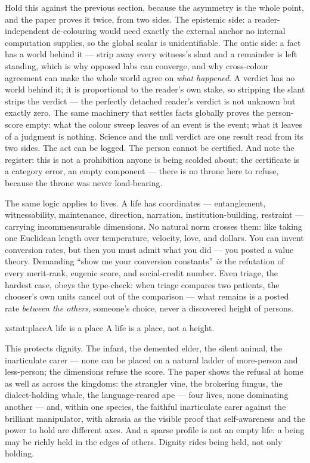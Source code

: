 \documentclass[../main_explainer]{subfiles}
\begin{document}
Hold this against the previous section, because the asymmetry is the whole point, and
the paper proves it twice, from two sides. The epistemic side: a reader-independent
de-colouring would need exactly the external anchor no internal computation supplies, so
the global scalar is unidentifiable. The ontic side: a fact has a world behind it ---
strip away every witness's slant and a remainder is left standing, which is why opposed
labs can converge, and why cross-colour agreement can make the whole world agree on
\emph{what happened}. A verdict has no world behind it; it is proportional to the
reader's own stake, so stripping the slant strips the verdict --- the perfectly detached
reader's verdict is not unknown but exactly zero. The same machinery that settles facts
globally proves the person-score empty: what the colour sweep leaves of an event is the
event; what it leaves of a judgment is nothing. Science and the null verdict are one
result read from its two sides. The act can be logged. The person cannot be certified.
And note the register: this is not a prohibition anyone is being scolded about; the
certificate is a category error, an empty component --- there is no throne here to
refuse, because the throne was never load-bearing.

The same logic applies to lives. A life has coordinates --- entanglement,
witnessability, maintenance, direction, narration, institution-building, restraint ---
carrying incommensurable dimensions. No natural norm crosses them: like taking one
Euclidean length over temperature, velocity, love, and dollars. You can invent
conversion rates, but then you must admit what you did --- you posted a value theory.
Demanding ``show me your conversion constants'' \emph{is} the refutation of every
merit-rank, eugenic score, and social-credit number. Even triage, the hardest case,
obeys the type-check: when triage compares two patients, the chooser's own units cancel
out of the comparison --- what remains is a posted rate \emph{between the others},
someone's choice, never a discovered height of persons.


\begin{statement}{xstmt:place}{A life is a place}
  A life is a place, not a height.
\end{statement}

This protects dignity. The infant, the demented elder, the silent animal, the
inarticulate carer --- none can be placed on a natural ladder of more-person and
less-person; the dimensions refuse the score. The paper shows the refusal at home as
well as across the kingdoms: the strangler vine, the brokering fungus, the
dialect-holding whale, the language-reared ape --- four lives, none dominating another
--- and, within one species, the faithful inarticulate carer against the brilliant
manipulator, with akrasia as the visible proof that self-awareness and the power to hold
are different axes. And a sparse profile is not an empty life: a being may be richly
held in the edges of others. Dignity rides being held, not only holding.
\end{document}
